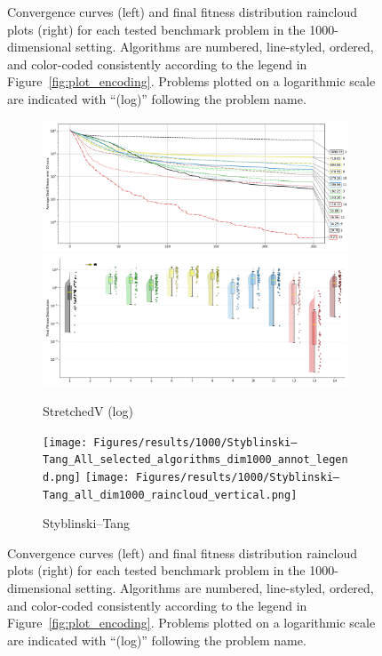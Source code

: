 \begin{figure}[p]
\captionsetup{list=no}
\caption[Convergence curves and final fitness distribution raincloud plots for 1000-dimensional problems]{Convergence curves (left) and final fitness distribution raincloud plots (right) for each tested benchmark problem in the 1000-dimensional setting. Algorithms are numbered, line-styled, ordered, and color-coded consistently according to the legend in Figure~\ref{fig:plot_encoding}. Problems plotted on a logarithmic scale are indicated with ``(log)'' following the problem name.}
\end{figure}





\begin{figure}[H]\ContinuedFloat
\renewcommand\thesubfigure{C.\arabic{figure}.\arabic{subfigure}}
    \centering

\begin{subfigure}{1\textwidth}
    \centering
    \includegraphics[width=.49\textwidth]{Figures/results/1000/StretchedV_All_selected_algorithms_dim1000_annot_legend.png}
    \includegraphics[width=.49\textwidth]{Figures/results/1000/StretchedV_all_dim1000_raincloud_vertical.png}
    \caption{StretchedV (log)}
\end{subfigure}

\begin{subfigure}{1\textwidth}
    \centering
    \texttt{[image: Figures/results/1000/Styblinski–Tang\_All\_selected\_algorithms\_dim1000\_annot\_legend.png]}
    \texttt{[image: Figures/results/1000/Styblinski–Tang\_all\_dim1000\_raincloud\_vertical.png]}
    \caption{Styblinski–Tang}
\end{subfigure}


\caption[Convergence curves and final fitness distribution raincloud plots for\\1000-dimensional problems]{Convergence curves (left) and final fitness distribution raincloud plots (right) for each tested benchmark problem in the 1000-dimensional setting. Algorithms are numbered, line-styled, ordered, and color-coded consistently according to the legend in Figure~\ref{fig:plot_encoding}. Problems plotted on a logarithmic scale are indicated with ``(log)'' following the problem name.}
\label{fig:results1000}
\end{figure}








